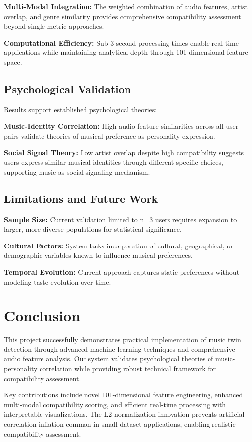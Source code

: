 \documentclass[conference]{IEEEtran}
\begin{document}
\textbf{Multi-Modal Integration:} The weighted combination of audio features, artist overlap, and genre similarity provides comprehensive compatibility assessment beyond single-metric approaches.

\textbf{Computational Efficiency:} Sub-3-second processing times enable real-time applications while maintaining analytical depth through 101-dimensional feature space.

\subsection{Psychological Validation}

Results support established psychological theories:

\textbf{Music-Identity Correlation:} High audio feature similarities across all user pairs validate theories of musical preference as personality expression.

\textbf{Social Signal Theory:} Low artist overlap despite high compatibility suggests users express similar musical identities through different specific choices, supporting music as social signaling mechanism.

\subsection{Limitations and Future Work}

\textbf{Sample Size:} Current validation limited to n=3 users requires expansion to larger, more diverse populations for statistical significance.

\textbf{Cultural Factors:} System lacks incorporation of cultural, geographical, or demographic variables known to influence musical preferences.

\textbf{Temporal Evolution:} Current approach captures static preferences without modeling taste evolution over time.

\section{Conclusion}

This project successfully demonstrates practical implementation of music twin detection through advanced machine learning techniques and comprehensive audio feature analysis. Our system validates psychological theories of music-personality correlation while providing robust technical framework for compatibility assessment.

Key contributions include novel 101-dimensional feature engineering, enhanced multi-modal compatibility scoring, and efficient real-time processing with interpretable visualizations. The L2 normalization innovation prevents artificial correlation inflation common in small dataset applications, enabling realistic compatibility assessment.
\end{document}
